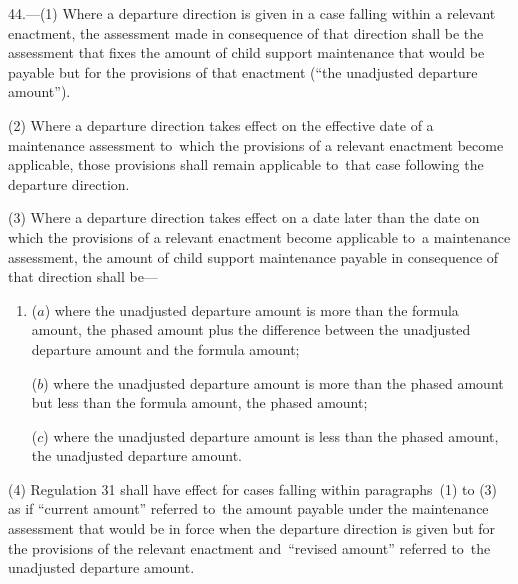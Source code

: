 \documentclass[12pt,a4paper]{article}
\begin{document}
44.—(1) Where a departure direction is given in a case
falling within a relevant enactment, the assessment made in consequence of that
direction shall be the assessment that fixes the amount of child support
maintenance that would be payable but for the provisions of that enactment (“the
unadjusted departure amount”).

(2) Where a departure direction takes effect on the effective date of a
maintenance assessment to~which the provisions of a relevant enactment become
applicable, those provisions shall remain applicable to~that case following the
departure direction.

(3) Where a departure direction takes effect on a date later than the date on
which the provisions of a relevant enactment become applicable to~a maintenance
assessment, the amount of child support maintenance payable in consequence of
that direction shall be—
\begin{enumerate}\item[]
($a$) where the unadjusted departure amount is more than the formula amount, the
phased amount plus the difference between the unadjusted departure amount and
the formula amount;

($b$) where the unadjusted departure amount is more than the phased amount but less
than the formula amount, the phased amount;

($c$) where the unadjusted departure amount is less than the phased amount, the
unadjusted departure amount.
\end{enumerate}

(4) Regulation 31 shall have effect for cases falling within paragraphs~(1) to
(3) as if “current amount” referred to~the amount payable under the maintenance
assessment that would be in force when the departure direction is given but for
the provisions of the relevant enactment and~“revised amount” referred to~the
unadjusted departure amount.
\end{document}
